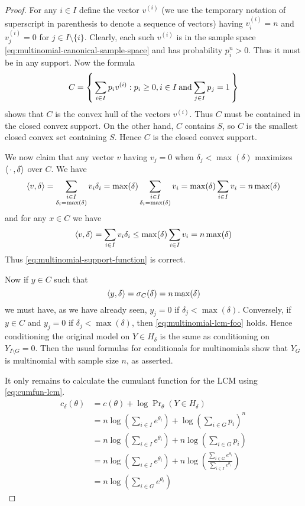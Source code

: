\begin{proof}
For any $i \in I$ define the vector $v^{(i)}$ (we use the temporary notation
of superscript in parenthesis to denote a sequence of vectors)
having $v^{(i)}_i = n$ and $v^{(i)}_j = 0$ for $j \in I \setminus \{ i \}$.
Clearly, each such $v^{(i)}$ is in
the sample space \eqref{eq:multinomial-canonical-sample-space} and
has probability $p_i^n > 0$.  Thus it must be in any support.
Now the formula
$$
   C = \left\{\,  \sum_{i \in I} p_i v^{(i)} : p_i \ge 0, i \in I \mathbin{\rm and}
   \sum_{j \in I} p_j = 1  \,\right\}
$$
shows that $C$ is the convex hull of the vectors $v^{(i)}$.  Thus $C$ must
be contained in the closed convex support.  On the other hand, $C$ contains
$S$, so $C$ is the smallest closed convex set containing $S$.  Hence
$C$ is the closed convex support.

We now claim that any vector $v$ having $v_j = 0$ when
$\delta_j < \max(\delta)$ maximizes $\langle \,\cdot\,, \delta \rangle$ over $C$.
We have
$$
   \langle v, \delta \rangle
   =
   \sum_{\substack{i \in I \\ \delta_i = \max(\delta)}} v_i \delta_i
   =
   \max(\delta)
   \sum_{\substack{i \in I \\ \delta_i = \max(\delta)}} v_i
   =
   \max(\delta)
   \sum_{i \in I} v_i
   =
   n \max(\delta)
$$
and for any $x \in C$ we have
$$
   \langle v, \delta \rangle
   =
   \sum_{i \in I} v_i \delta_i
   \le
   \max(\delta)
   \sum_{i \in I} v_i
   =
   n \max(\delta)
$$
Thus \eqref{eq:multinomial-support-function} is correct.

Now if $y \in C$ such that
\begin{equation} \label{eq:multinomial-lcm-foo}
   \langle y, \delta \rangle = \sigma_C(\delta) = n \max(\delta)
\end{equation}
we must have, as we have already seen, $y_j = 0$ if $\delta_j < \max(\delta)$.
Conversely, if $y \in C$ and $y_j = 0$ if $\delta_j < \max(\delta)$,
then \eqref{eq:multinomial-lcm-foo} holds.
Hence conditioning the original model on $Y \in H_\delta$ is the same as
conditioning on $Y_{I \setminus G} = 0$.  Then the usual formulas
for conditionals for multinomials show that $Y_G$ is multinomial
with sample size $n$, as asserted.

It only remains to calculate the cumulant function for the LCM using
\eqref{eq:cumfun-lcm}.
\begin{align*}
   c_\delta(\theta)
   & =
   c(\theta) + \log \Pr\nolimits_\theta(Y \in H_\delta)
   \\
   & =
   n \log \left( \sum_{i \in I} e^{\theta_i} \right)
   +
   \log \left( \sum_{i \in G} p_i \right)^n
   \\
   & =
   n \log \left( \sum_{i \in I} e^{\theta_i} \right)
   +
   n \log \left( \sum_{i \in G} p_i \right)
   \\
   & =
   n \log \left( \sum_{i \in I} e^{\theta_i} \right)
   +
   n \log \left(
   \frac{\sum_{i \in G} e^{\theta_i}}{\sum_{i \in I} e^{\theta_i}} \right)
   \\
   & =
   n \log \left( \sum_{i \in G} e^{\theta_i} \right)
\end{align*}
\end{proof}

